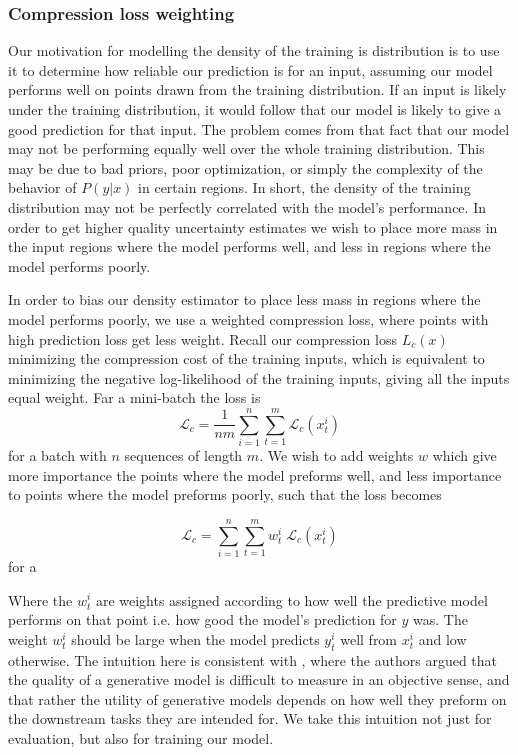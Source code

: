 \documentclass[../main.tex]{subfiles}
\begin{document}
\subsubsection{Compression loss weighting}

Our motivation for modelling the density of the training is distribution is to use it to determine how reliable our prediction is for an input, assuming our model performs well on points drawn from the training distribution.
If an input is likely under the training distribution, it would follow that our model is likely to give a good prediction for that input. The problem comes from that fact that our model may not be performing equally well over the whole training distribution. This may be due to bad priors, poor optimization, or simply the complexity of the behavior of $P(y|x)$ in certain regions. In short, the density of the training distribution may not be perfectly correlated with the model's performance. In order to get higher quality uncertainty estimates we wish to place more mass in the input regions where the model performs well, and less in regions where the model performs poorly. 

In order to bias our density estimator to place less mass in regions where the model performs poorly, we use a weighted compression loss, where points with high prediction loss get less weight. Recall our compression loss ${L}_c(x)$ minimizing the compression cost of the training inputs, which is equivalent to minimizing the negative log-likelihood of the training inputs, giving all the inputs equal weight. Far a mini-batch the loss is
\begin{equation}{}
    \mathcal{L}_c = \frac{1}{nm} \sum_{i=1}^n \sum_{t=1}^m \mathcal{L}_c(x^i_t) 
\end{equation}
for a batch with $n$ sequences of length $m$. We wish to add weights $w$ which give more importance the points where the model preforms well, and less importance to points where the model preforms poorly, such that the loss becomes

\begin{equation}
    \mathcal{L}_c  =  \sum_{i=1}^{n}  \sum_{t=1}^{m} w^i_t \; \mathcal{L}_c(x^i_t) 
\end{equation}
for a 

Where the $w^i_t$ are weights assigned according to how well the predictive model performs on that point i.e. how good the model's prediction for $y$ was. The weight $w^i_t$ should be large when the model predicts $y^i_t$  well from $x^i_t$ and low otherwise. The intuition here is consistent with \cite{theis2015note}, where the authors argued that the quality of a generative model is difficult to measure in an objective sense, and that rather the utility of generative models depends on how well they preform on the downstream tasks they are intended for. We take this intuition not just for evaluation, but also for training our model. 
\end{document}
